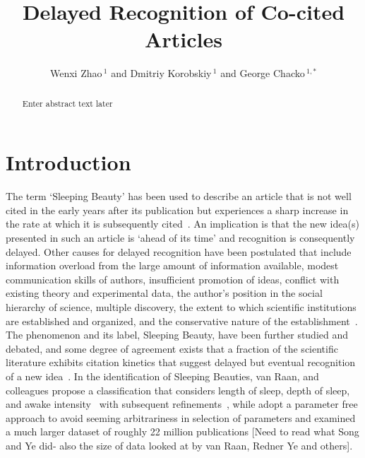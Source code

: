 \documentclass[utf8]{frontiersSCNS}
\def\firstAuthorLast{Zhao {et~al.}} %
\def\Authors{Wenxi Zhao\,$^{1}$ and Dmitriy Korobskiy\,$^{1}$  and George Chacko\,$^{1,*}$} %
\begin{document}
\onecolumn
{}

\title[Delayed Co-citations]{Delayed Recognition of Co-cited Articles} 

\author[\firstAuthorLast ]{\Authors} %
\address{} %
\correspondance{} %

\extraAuth{}%

\maketitle

\begin{abstract}
Enter abstract text later
\end{abstract}

\section{Introduction}

The term `Sleeping Beauty' has been used to describe an article that is not well cited in the early years after its publication but experiences a sharp increase in the rate at which it is subsequently cited~\citep{Raan2004}. An implication is that the new idea(s) presented in such an article is `ahead of its time' and recognition is consequently delayed. Other causes for delayed recognition have been postulated that include information overload from the large amount of information available, modest communication skills of authors, insufficient promotion of ideas, conflict with existing theory and experimental data, the author's position in the social hierarchy of science, multiple discovery, the extent to which scientific institutions are established and organized, and the conservative nature of the establishment~\citep{Barber1961,Merton1963,Cole1970,Garfield1970a,Garfield1980a}. The phenomenon and its label, Sleeping Beauty, have been further studied and debated, and some degree of agreement exists that a fraction of the scientific literature exhibits citation kinetics that suggest delayed but eventual recognition of a new idea~\citep{Glanzel2003,Glanzel2004,redner_2005,Braun_2010,Li2014,Ke2015,Li2016,Song2018,sugimoto_mostafa_2018}. In the identification of Sleeping Beauties, van Raan, and colleagues propose a classification that considers length of sleep, depth of sleep, and awake intensity~\citep{Raan2004} with subsequent refinements~\citep{Raan2019}, while \cite{Ke2015} adopt a parameter free approach to avoid seeming arbitrariness in selection of parameters and examined a much larger dataset of roughly 22 million publications [Need to read what Song and Ye did- also the size of data looked at by van Raan, Redner Ye and others].
\end{document}
